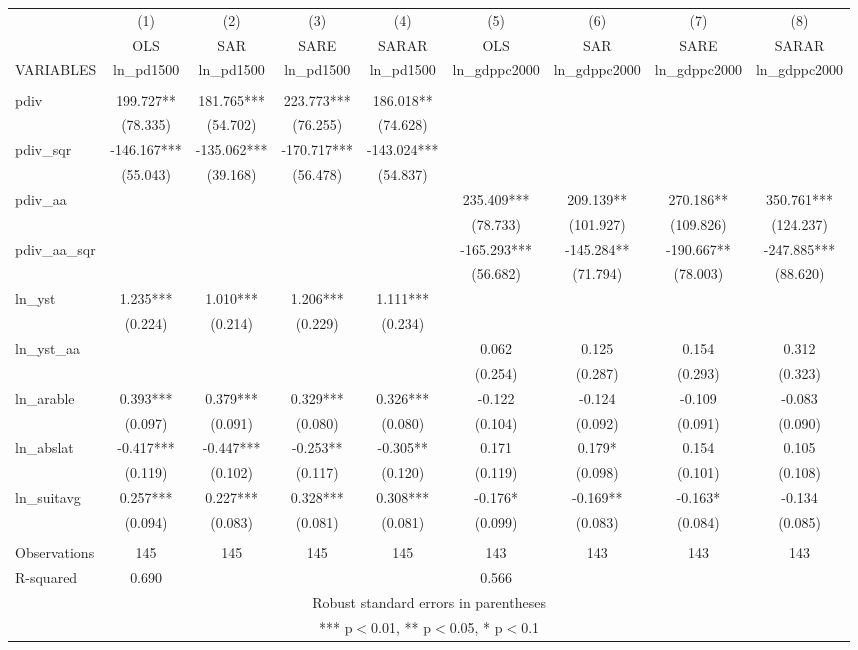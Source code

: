 \documentclass[]{article}
\begin{document}
\begin{tabular}{lcccccccc} \hline
 & (1) & (2) & (3) & (4) & (5) & (6) & (7) & (8) \\
 & OLS & SAR & SARE & SARAR & OLS & SAR & SARE & SARAR \\
VARIABLES & ln\_pd1500 & ln\_pd1500 & ln\_pd1500 & ln\_pd1500 & ln\_gdppc2000 & ln\_gdppc2000 & ln\_gdppc2000 & ln\_gdppc2000 \\ \hline
 &  &  &  &  &  &  &  &  \\
pdiv & 199.727** & 181.765*** & 223.773*** & 186.018** &  &  &  &  \\
 & (78.335) & (54.702) & (76.255) & (74.628) &  &  &  &  \\
pdiv\_sqr & -146.167*** & -135.062*** & -170.717*** & -143.024*** &  &  &  &  \\
 & (55.043) & (39.168) & (56.478) & (54.837) &  &  &  &  \\
pdiv\_aa &  &  &  &  & 235.409*** & 209.139** & 270.186** & 350.761*** \\
 &  &  &  &  & (78.733) & (101.927) & (109.826) & (124.237) \\
pdiv\_aa\_sqr &  &  &  &  & -165.293*** & -145.284** & -190.667** & -247.885*** \\
 &  &  &  &  & (56.682) & (71.794) & (78.003) & (88.620) \\
ln\_yst & 1.235*** & 1.010*** & 1.206*** & 1.111*** &  &  &  &  \\
 & (0.224) & (0.214) & (0.229) & (0.234) &  &  &  &  \\
ln\_yst\_aa &  &  &  &  & 0.062 & 0.125 & 0.154 & 0.312 \\
 &  &  &  &  & (0.254) & (0.287) & (0.293) & (0.323) \\
ln\_arable & 0.393*** & 0.379*** & 0.329*** & 0.326*** & -0.122 & -0.124 & -0.109 & -0.083 \\
 & (0.097) & (0.091) & (0.080) & (0.080) & (0.104) & (0.092) & (0.091) & (0.090) \\
ln\_abslat & -0.417*** & -0.447*** & -0.253** & -0.305** & 0.171 & 0.179* & 0.154 & 0.105 \\
 & (0.119) & (0.102) & (0.117) & (0.120) & (0.119) & (0.098) & (0.101) & (0.108) \\
ln\_suitavg & 0.257*** & 0.227*** & 0.328*** & 0.308*** & -0.176* & -0.169** & -0.163* & -0.134 \\
 & (0.094) & (0.083) & (0.081) & (0.081) & (0.099) & (0.083) & (0.084) & (0.085) \\
 &  &  &  &  &  &  &  &  \\
Observations & 145 & 145 & 145 & 145 & 143 & 143 & 143 & 143 \\
 R-squared & 0.690 &  &  &  & 0.566 &  &  &  \\ \hline
\multicolumn{9}{c}{ Robust standard errors in parentheses} \\
\multicolumn{9}{c}{ *** p$<$0.01, ** p$<$0.05, * p$<$0.1} \\
\end{tabular}
\end{document}

